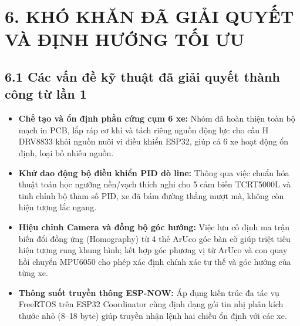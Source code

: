 \documentclass[14pt,a4paper]{extreport}
\begin{document}
\chapter*{6. KHÓ KHĂN ĐÃ GIẢI QUYẾT VÀ ĐỊNH HƯỚNG TỐI ƯU}
 
\section*{6.1 Các vấn đề kỹ thuật đã giải quyết thành công từ lần 1}
\begin{itemize}
    \item \textbf{Chế tạo và ổn định phần cứng cụm 6 xe:} Nhóm đã hoàn thiện toàn bộ mạch in PCB, lắp ráp cơ khí và tách riêng nguồn động lực cho cầu H DRV8833 khỏi nguồn nuôi vi điều khiển ESP32, giúp cả 6 xe hoạt động ổn định, loại bỏ nhiễu nguồn.
    \item \textbf{Khử dao động bộ điều khiển PID dò line:} Thông qua việc chuẩn hóa thuật toán học ngưỡng nền/vạch thích nghi cho 5 cảm biến TCRT5000L và tinh chỉnh bộ tham số PID, xe đã bám đường thẳng mượt mà, không còn hiện tượng lắc ngang.
    \item \textbf{Hiệu chỉnh Camera và đồng bộ góc hướng:} Việc lưu cố định ma trận biến đổi đồng ứng (Homography) từ 4 thẻ ArUco góc bàn cờ giúp triệt tiêu hiện tượng rung khung hình; kết hợp góc phương vị từ ArUco và con quay hồi chuyển MPU6050 cho phép xác định chính xác tư thế và góc hướng của từng xe.
    \item \textbf{Thông suốt truyền thông ESP-NOW:} Áp dụng kiến trúc đa tác vụ FreeRTOS trên ESP32 Coordinator cùng định dạng gói tin nhị phân kích thước nhỏ (8--18 byte) giúp truyền nhận lệnh hai chiều ổn định với các xe.
\end{itemize}
\end{document}
